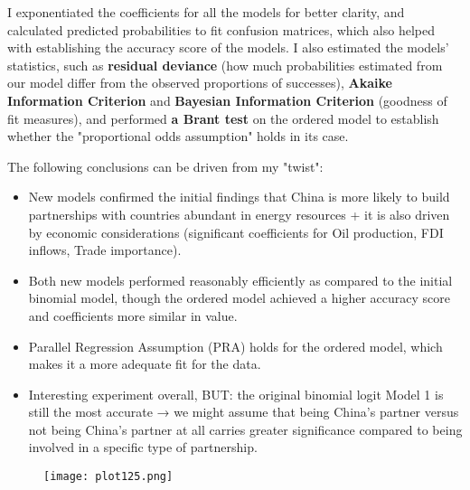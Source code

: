 \documentclass[12pt,letterpaper]{article}
\begin{document}
I exponentiated the coefficients for all the models for better clarity, and calculated predicted probabilities to fit confusion matrices, which also helped with establishing the accuracy score of the models. I also estimated the models' statistics, such as \textbf{residual deviance} (how much probabilities estimated from our model differ from the observed proportions of successes), \textbf{Akaike Information Criterion} and \textbf{Bayesian Information Criterion} (goodness of fit measures), and performed \textbf{a Brant test} on the ordered model to establish whether the "proportional odds assumption" holds in its case. 

The following conclusions can be driven from my "twist":

\begin{itemize}
    \item New models confirmed the initial findings that China is more likely to build partnerships with countries abundant in
energy resources + it is also driven by economic considerations (significant coefficients for Oil production, FDI inflows, Trade importance).
\item Both new models performed reasonably efficiently as compared to the initial binomial model, though the ordered
model achieved a higher accuracy score and coefficients more similar in value.
\item Parallel Regression Assumption (PRA) holds for the ordered model, which makes it a more adequate fit for the data.
\item Interesting experiment overall, BUT: the original binomial logit Model 1 is still the most accurate → we might assume
that being China’s partner versus not being China’s partner at all carries greater significance compared to being involved
in a specific type of partnership.
\end{itemize}


  

\begin{figure}[H]
    \centering
    \texttt{[image: plot125.png]}
\end{figure}

  
\end{document}
